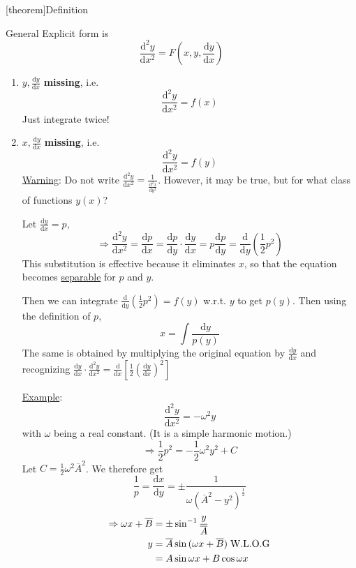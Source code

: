 \documentclass[12pt]{report}
\theoremstyle{definition}
\begin{document}
[theorem]{Definition}
\begin{General 2nd order ODE}
    General Explicit form is\[
        \frac{\mathrm{d}^{2}y}{\mathrm{d}x^{2}} = F\left(x,y,\frac{\mathrm{d}y}{\mathrm{d}x} \right) 
    \]
\end{General 2nd order ODE}

\begin{enumerate}[label = (\alph*)]
    \item $y, \frac{\mathrm{d}y}{\mathrm{d}x}$ \textbf{missing}, i.e. \[
            \frac{\mathrm{d}^{2}y}{\mathrm{d}x^{2}} = f(x)
    \]Just integrate twice!

\item $x, \frac{\mathrm{d}y}{\mathrm{d}x}$ \textbf{missing}, i.e. \[
        \frac{\mathrm{d}^{2}y}{\mathrm{d}x^{2}} = f(y)
\]
\underline{Warning}: Do not write $\frac{\mathrm{d}^{2}y}{\mathrm{d}x^{2}} = \frac{1}{\frac{\mathrm{d}^{2}x}{\mathrm{d}y^{2}} } $.
However, it may be true, but for what class of functions $y(x)$?

Let $\frac{\mathrm{d}y}{\mathrm{d}x} = p$,\[
    \Rightarrow \frac{\mathrm{d}^{2}y}{\mathrm{d}x^{2}} = \frac{\mathrm{d}p}{\mathrm{d}x} 
    =\frac{\mathrm{d}p}{\mathrm{d}y} \cdot \frac{\mathrm{d}y}{\mathrm{d}x} = p \frac{\mathrm{d}p}{\mathrm{d}y} 
    = \frac{\mathrm{d}}{\mathrm{d}y} \left(\frac{1}{2}p^{2}\right) 
\]This substitution is effective because it eliminates $x$,
so that the equation becomes \underline{separable} for $p$ and $y$.

Then we can integrate $\frac{\mathrm{d}}{\mathrm{d}y} \left(\frac{1}{2}p^{2}\right) = f(y)$
w.r.t. $y$ to get $p(y)$. Then using the definition of $p$,\[
x = \int \frac{\mathrm{d}y}{p(y)}
\]
The same is obtained by multiplying the original equation by $\frac{\mathrm{d}y}{\mathrm{d}x} $
and recognizing $\frac{\mathrm{d}y}{\mathrm{d}x} \cdot \frac{\mathrm{d}^{2}y}{\mathrm{d}x^{2}} 
= \frac{\mathrm{d}}{\mathrm{d}x} \left[\frac{1}{2}{(\frac{\mathrm{d}y}{\mathrm{d}x} )}^{2}\right] $

\underline{Example}: \[
    \frac{\mathrm{d}^{2}y}{\mathrm{d}x^{2}} = -\omega^{2}y
\]with $\omega$ being a real constant. (It is a simple harmonic motion.)
\[
    \Rightarrow \frac{1}{2}p^{2} = -\frac{1}{2}\omega^{2}y^{2} + C
\]Let $C = \frac{1}{2}\omega^{2}\overline{A}^{2}$. We therefore get\[
\frac{1}{p} = \frac{\mathrm{d}x}{\mathrm{d}y} = \pm \frac{1}{\omega {(\overline{A}^{2} - y^{2})}^{\frac{1}{2}}}
\]\[
\begin{align*}
    \Rightarrow \omega x + \overline{B} & = \pm \sin^{-1}{\frac{y}{\overline{A}}} \\
        y & = \overline{A} \sin{(\omega x + \overline{B})} \;\textnormal{W.L.O.G} \\
          & = A\sin{\omega x} + B\cos{\omega x}
\end{align*}
\]


\end{enumerate}
\end{document}
